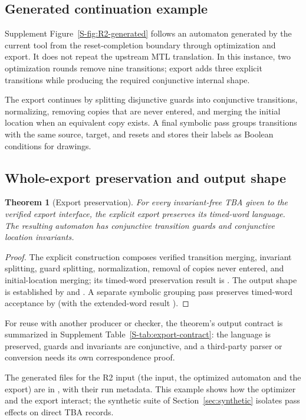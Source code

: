 \documentclass[preprint,12pt]{elsarticle}
\let\pathfragile\path
\DeclareRobustCommand\path{\pathfragile}
\newtheorem{theorem}{Theorem}[section]
\begin{document}
\subsection{Generated continuation example}
Supplement Figure~\ref{S-fig:R2-generated} follows an automaton generated by the current tool from the reset-completion boundary through optimization and export. It does not repeat the upstream MTL translation. In this instance, two optimization rounds remove nine transitions; export adds three explicit transitions while producing the required conjunctive internal shape.

The export continues by splitting disjunctive guards into conjunctive transitions, normalizing, removing copies that are never entered, and merging the initial location when an equivalent copy exists. A final symbolic pass groups transitions with the same source, target, and resets and stores their labels as Boolean conditions for drawings.

\subsection{Whole-export preservation and output shape}
\begin{theorem}[Export preservation]
\label{thm:export}
For every invariant-free TBA given to the verified export interface, the explicit export preserves its timed-word language. The resulting automaton has conjunctive transition guards and conjunctive location invariants.
\end{theorem}
\begin{proof}
The explicit construction composes verified transition merging, invariant splitting, guard splitting, normalization, removal of copies never entered, and initial-location merging; its timed-word preservation result is . The output shape is established by  and . A separate symbolic grouping pass preserves timed-word acceptance by  (with the extended-word result ).
\end{proof}
For reuse with another producer or checker, the theorem's output contract is
summarized in Supplement Table~\ref{S-tab:export-contract}: the language is preserved, guards and invariants are conjunctive, and a third-party parser or conversion needs its own correspondence proof.

The generated files for the R2 input (the input, the optimized automaton and the export)
are in , with their run
metadata. This example shows how the optimizer and the export interact; the synthetic suite
of Section~\ref{sec:synthetic} isolates pass effects on direct TBA records.
\end{document}
